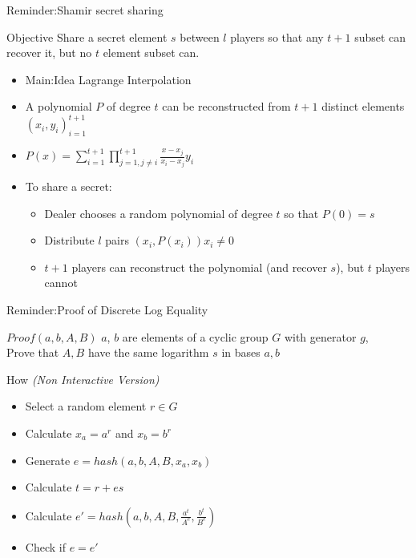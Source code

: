 \documentclass{beamer}
\begin{document}
\begin{frame}{Reminder:Shamir secret sharing}
\begin{block}{Objective}
Share a secret element $s$ between $l$ players so that any $t+1$ subset can recover it, but no $t$ element subset can.
\end{block}
\begin{itemize}
\item Main:Idea Lagrange Interpolation
\item A polynomial $P$ of degree $t$ can be reconstructed from $t+1$ distinct elements $(x_i, y_i)_{i=1}^{t+1}$
\item $P(x) = \sum_{i=1}^{t+1} \prod_{j=1,j \neq i}^{t+1} \frac{x-x_j}{x_i - x_j}  y_i$  
\item To share a secret:
\begin{itemize}
\item Dealer chooses a random polynomial of degree $t$ so that $P(0) = s$
\item Distribute $l$ pairs $(x_i,P(x_i)) x_i \neq 0$
\item $t+1$ players can reconstruct the polynomial (and recover $s$), but $t$ players cannot
\end{itemize}
\end{itemize}
\end{frame}

\begin{frame}{Reminder:Proof of Discrete Log Equality}
\begin{block}{$Proof(a,b,A,B)$}
$a$, $b$ are elements of a cyclic group $G$ with generator $g$, \\ 
Prove that $A,B$ have the same logarithm $s$ in bases $a,b$
\end{block}
How \textit{(Non Interactive Version)}
\begin{itemize}
\item Select a random element $r \in G$
\item Calculate $x_a = a^r$ and $x_b = b^r$
\item Generate $e = hash(a,b,A,B,x_a,x_b)$ 
\item Calculate $t = r+e  s$
\item Calculate $e' = hash (a,b,A,B, \frac{a^t}{A^e}, \frac{b^t}{B^e} )$
\item Check if $e=e'$
\end{itemize}
\end{frame}
\end{document}
